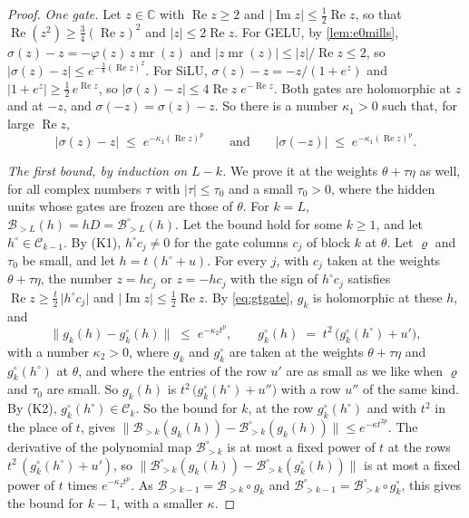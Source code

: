 \documentclass[10pt]{article}
\theoremstyle{definition}
\theoremstyle{remark}
\newcommand{\norm}[1]{\lVert #1\rVert}
\begin{document}
\begin{proof}
\emph{One gate.} Let $z \in \mathbb C$ with $\operatorname{Re}z \ge 2$ and $\lvert\operatorname{Im}z\rvert \le \frac12\operatorname{Re}z$, so that $\operatorname{Re}(z^2) \ge \frac34(\operatorname{Re}z)^2$ and $\lvert z\rvert \le 2\operatorname{Re}z$. For GELU, by \cref{lem:e0mills}, $\sigma(z) - z = -\varphi(z)\,z\operatorname{mr}(z)$ and $\lvert z\operatorname{mr}(z)\rvert \le \lvert z\rvert/\operatorname{Re}z \le 2$, so $\lvert\sigma(z) - z\rvert \le e^{-\frac38(\operatorname{Re}z)^2}$. For SiLU, $\sigma(z) - z = -z/(1 + e^{z})$ and $\lvert 1 + e^{z}\rvert \ge \frac12\,e^{\operatorname{Re}z}$, so $\lvert\sigma(z) - z\rvert \le 4\operatorname{Re}z\;e^{-\operatorname{Re}z}$. Both gates are holomorphic at $z$ and at $-z$, and $\sigma(-z) = \sigma(z) - z$. So there is a number $\kappa_1 > 0$ such that, for large $\operatorname{Re}z$,
\begin{equation}\label{eq:gtgate}
\lvert\sigma(z) - z\rvert \;\le\; e^{-\kappa_1(\operatorname{Re}z)^p} \qquad\text{and}\qquad \lvert\sigma(-z)\rvert \;\le\; e^{-\kappa_1(\operatorname{Re}z)^p} .
\end{equation}

\emph{The first bound, by induction on $L - k$.} We prove it at the weights $\theta + \tau\eta$ as well, for all complex numbers $\tau$ with $\lvert\tau\rvert \le \tau_0$ and a small $\tau_0 > 0$, where the hidden units whose gates are frozen are those of $\theta$. For $k = L$, $\mathcal B_{>L}(h) = hD = \mathcal B^\circ_{>L}(h)$. Let the bound hold for some $k \ge 1$, and let $h^\circ \in \mathcal C_{k-1}$. By (K1), $h^\circ c_j \neq 0$ for the gate columns $c_j$ of block $k$ at $\theta$. Let $\varrho$ and $\tau_0$ be small, and let $h = t\,(h^\circ + u)$. For every $j$, with $c_j$ taken at the weights $\theta + \tau\eta$, the number $z = hc_j$ or $z = -hc_j$ with the sign of $h^\circ c_j$ satisfies $\operatorname{Re}z \ge \frac t2\,\lvert h^\circ c_j\rvert$ and $\lvert\operatorname{Im}z\rvert \le \frac12\operatorname{Re}z$. By \eqref{eq:gtgate}, $g_k$ is holomorphic at these $h$, and
\[
\norm{g_k(h) - g^\circ_k(h)} \;\le\; e^{-\kappa_2t^p}, \qquad g^\circ_k(h) \;=\; t^2\,\big(g^\circ_k(h^\circ) + u'\big),
\]
with a number $\kappa_2 > 0$, where $g_k$ and $g^\circ_k$ are taken at the weights $\theta + \tau\eta$ and $g^\circ_k(h^\circ)$ at $\theta$, and where the entries of the row $u'$ are as small as we like when $\varrho$ and $\tau_0$ are small. So $g_k(h)$ is $t^2\,\big(g^\circ_k(h^\circ) + u''\big)$ with a row $u''$ of the same kind. By (K2), $g^\circ_k(h^\circ) \in \mathcal C_k$. So the bound for $k$, at the row $g^\circ_k(h^\circ)$ and with $t^2$ in the place of $t$, gives $\norm{\mathcal B_{>k}(g_k(h)) - \mathcal B^\circ_{>k}(g_k(h))} \le e^{-\kappa t^{2p}}$. The derivative of the polynomial map $\mathcal B^\circ_{>k}$ is at most a fixed power of $t$ at the rows $t^2\,(g^\circ_k(h^\circ) + u')$, so $\norm{\mathcal B^\circ_{>k}(g_k(h)) - \mathcal B^\circ_{>k}(g^\circ_k(h))}$ is at most a fixed power of $t$ times $e^{-\kappa_2t^p}$. As $\mathcal B_{>k-1} = \mathcal B_{>k}\circ g_k$ and $\mathcal B^\circ_{>k-1} = \mathcal B^\circ_{>k}\circ g^\circ_k$, this gives the bound for $k - 1$, with a smaller $\kappa$.


\end{proof}
\end{document}
